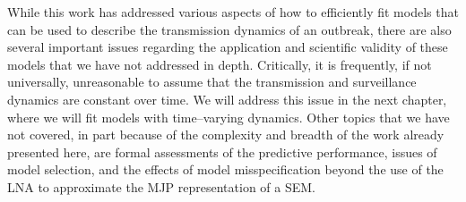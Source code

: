While this work has addressed various aspects of how to efficiently fit models that can be used to describe the transmission dynamics of an outbreak, there are also several important issues regarding the application and scientific validity of these models that we have not addressed in depth. Critically, it is frequently, if not universally, unreasonable to assume that the transmission and surveillance dynamics are constant over time. We will address this issue in the next chapter, where we will fit models with time--varying dynamics. Other topics that we have not covered, in part because of the complexity and breadth of the work already presented here, are formal assessments of the predictive performance, issues of model selection, and the effects of model misspecification beyond the use of the LNA to approximate the MJP representation of a SEM.